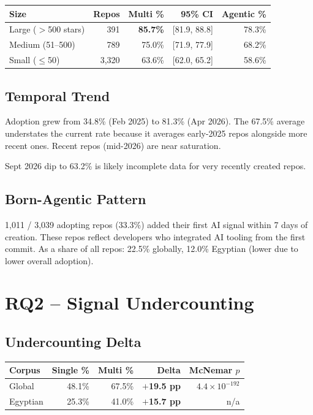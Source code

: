 \documentclass[12pt,a4paper]{article}
\begin{document}
\begin{table}[h]
\centering
\begin{tabular}{@{}lrrrr@{}}
\toprule
Size & Repos & Multi \% & 95\% CI & Agentic \% \\
\midrule
Large ($>$500 stars)  &   391 & \textbf{85.7\%} & [81.9, 88.8] & 78.3\% \\
Medium (51--500)      &   789 & 75.0\%          & [71.9, 77.9] & 68.2\% \\
Small ($\leq$50)      & 3,320 & 63.6\%          & [62.0, 65.2] & 58.6\% \\
\bottomrule
\end{tabular}
\end{table}

\subsection{Temporal Trend}

Adoption grew from 34.8\% (Feb 2025) to 81.3\% (Apr 2026). The 67.5\% average understates the current rate because it averages early-2025 repos alongside more recent ones. Recent repos (mid-2026) are near saturation.

Sept 2026 dip to 63.2\% is likely incomplete data for very recently created repos.

\subsection{Born-Agentic Pattern}

1,011 / 3,039 adopting repos (33.3\%) added their first AI signal within 7 days of creation. These repos reflect developers who integrated AI tooling from the first commit. As a share of all repos: 22.5\% globally, 12.0\% Egyptian (lower due to lower overall adoption).

\section{RQ2 -- Signal Undercounting}

\subsection{Undercounting Delta}

\begin{table}[h]
\centering
\begin{tabular}{@{}lrrrr@{}}
\toprule
Corpus & Single \% & Multi \% & Delta & McNemar $p$ \\
\midrule
Global   & 48.1\% & 67.5\% & \textbf{$+$19.5 pp} & $4.4 \times 10^{-192}$ \\
Egyptian & 25.3\% & 41.0\% & \textbf{$+$15.7 pp} & n/a \\
\bottomrule
\end{tabular}
\end{table}
\end{document}

